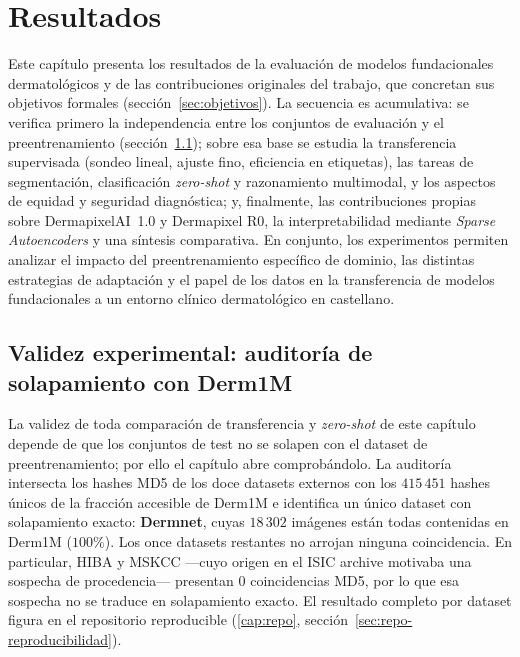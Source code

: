 
\chapter{Resultados}
\label{cap:resultados}

Este capítulo presenta los resultados de la evaluación de modelos
fundacionales dermatológicos y de las contribuciones originales del
trabajo, que concretan sus objetivos formales
(sección~\ref{sec:objetivos}). La secuencia es acumulativa: se verifica
primero la independencia entre los conjuntos de evaluación y el
preentrenamiento (sección~\ref{sec:auditoria-resultados}); sobre esa
base se estudia la transferencia supervisada (sondeo lineal, ajuste
fino, eficiencia en etiquetas), las tareas de segmentación,
clasificación \emph{zero-shot} y razonamiento multimodal, y los
aspectos de equidad y seguridad diagnóstica; y, finalmente, las
contribuciones propias sobre DermapixelAI~1.0 y Dermapixel R0, la
interpretabilidad mediante \emph{Sparse Autoencoders} y una síntesis
comparativa. En conjunto, los experimentos permiten analizar el
impacto del preentrenamiento específico de dominio, las distintas
estrategias de adaptación y el papel de los datos en la transferencia
de modelos fundacionales a un entorno clínico dermatológico en
castellano.

\section{Validez experimental: auditoría de solapamiento con Derm1M}
\label{sec:auditoria-resultados}

La validez de toda comparación de transferencia y \emph{zero-shot}
de este capítulo depende de que los conjuntos de test no se solapen
con el dataset de preentrenamiento; por ello el capítulo abre
comprobándolo. La auditoría intersecta los hashes MD5 de los doce
datasets externos con los $415\,451$ hashes únicos de la fracción
accesible de Derm1M e identifica un único dataset con solapamiento
exacto: \textbf{Dermnet}, cuyas $18\,302$ imágenes están todas
contenidas en Derm1M ($100\%$). Los once datasets restantes no
arrojan ninguna coincidencia. En particular, HIBA y MSKCC ---cuyo
origen en el ISIC archive motivaba una sospecha de procedencia---
presentan $0$ coincidencias MD5, por lo que esa sospecha no se
traduce en solapamiento exacto. El resultado completo por dataset
figura en el repositorio reproducible (\ref{cap:repo}, sección~\ref{sec:repo-reproducibilidad}).

